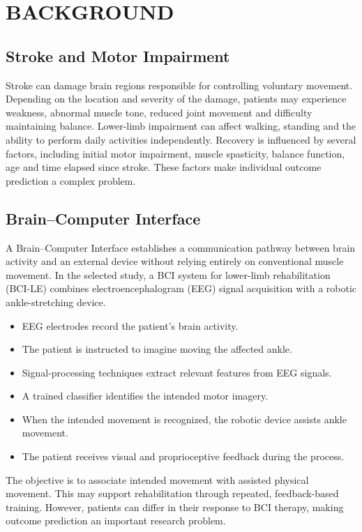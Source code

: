 \chapter{\MakeUppercase{Background}}
\setcounter{equation}{0}

\section{{Stroke and Motor Impairment}}

Stroke can damage brain regions responsible for controlling voluntary movement. Depending on the
location and severity of the damage, patients may experience weakness, abnormal muscle tone,
reduced joint movement and difficulty maintaining balance. Lower-limb impairment can affect walking,
standing and the ability to perform daily activities independently.
Recovery is influenced by several factors, including initial motor impairment, muscle spasticity, balance
function, age and time elapsed since stroke. These factors make individual outcome prediction a
complex problem.

\section{{Brain–Computer Interface}}

A Brain–Computer Interface establishes a communication pathway between brain activity and an
external device without relying entirely on conventional muscle movement. In the selected study, a BCI
system for lower-limb rehabilitation (BCI-LE) combines electroencephalogram (EEG) signal acquisition
with a robotic ankle-stretching device.
\begin{itemize}
    \item EEG electrodes record the patient's brain activity.
    \item The patient is instructed to imagine moving the affected ankle.
    \item Signal-processing techniques extract relevant features from EEG signals.
    \item A trained classifier identifies the intended motor imagery.
    \item When the intended movement is recognized, the robotic device assists ankle movement.
    \item The patient receives visual and proprioceptive feedback during the process.
\end{itemize}
The objective is to associate intended movement with assisted physical movement. This may support
rehabilitation through repeated, feedback-based training. However, patients can differ in their response
to BCI therapy, making outcome prediction an important research problem.\cite{bib3}


